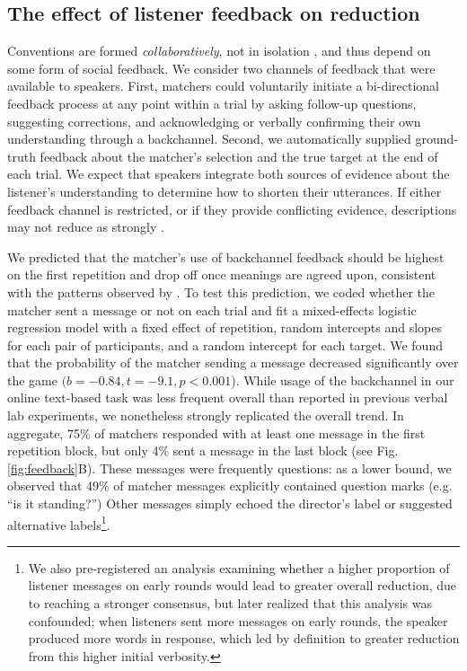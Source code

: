 \documentclass[alpha-refs]{wiley-article}
\begin{document}
\subsection{The effect of listener feedback on reduction}\label{listener-feedback}

Conventions are formed \emph{collaboratively}, not in isolation \citep{ClarkWilkesGibbs86_ReferringCollaborative,SchoberClark89_Overhearers}, and thus depend on some form of social feedback.
We consider two channels of feedback that were available to speakers.
First, matchers could voluntarily initiate a bi-directional feedback process at any point within a trial by asking follow-up questions, suggesting corrections, and acknowledging or verbally confirming their own understanding through a backchannel.
Second, we automatically supplied ground-truth feedback about the matcher's selection and the true target at the end of each trial.
We expect that speakers integrate both sources of evidence about the listener's understanding to determine how to shorten their utterances.
If either feedback channel is restricted, or if they provide conflicting evidence, descriptions may not reduce as strongly \citep{KraussWeinheimer66_Tangrams, HupetChantraine92_CollaborationOrRepitition, GarrodFayLeeOberlanderMacLeod07_GraphicalSymbolSystems}.

We predicted that the matcher's use of backchannel feedback should be highest on the first repetition and drop off once meanings are agreed upon, consistent with the patterns observed by \citep{ClarkWilkesGibbs86_ReferringCollaborative}.
To test this prediction, we coded whether the matcher sent a message or not on each trial and fit a mixed-effects logistic regression model with a fixed effect of repetition, random intercepts and slopes for each pair of participants, and a random intercept for each target.
We found that the probability of the matcher sending a message decreased significantly over the game $(b=-0.84, t = -9.1, p < 0.001$).
While usage of the backchannel in our online text-based task was less frequent overall than reported in previous verbal lab experiments, we nonetheless strongly replicated the overall trend.
In aggregate, 75\% of matchers responded with at least one message in the first repetition block, but only 4\% sent a message in the last block (see Fig. \ref{fig:feedback}B).
These messages were frequently questions: as a lower bound, we observed that 49\% of matcher messages explicitly contained question marks (e.g. ``is it standing?'')
Other messages simply echoed the director's label or suggested alternative labels\footnote{We also pre-registered an analysis examining whether a higher proportion of listener messages on early rounds would lead to greater overall reduction, due to reaching a stronger consensus, but later realized that this analysis was confounded; when listeners sent more messages on early rounds, the speaker produced more words in response, which led by definition to greater reduction from this higher initial verbosity.}.
\end{document}
